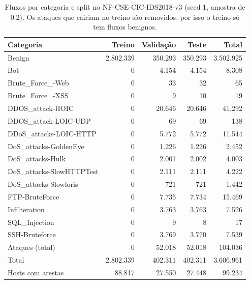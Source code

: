\begin{table}[ht]
\centering
\caption{Fluxos por categoria e split no NF-CSE-CIC-IDS2018-v3 (seed 1, amostra de 0.2). Os ataques que cairiam no treino são removidos, por isso o treino só tem fluxos benignos.}
\label{tab:split-nf-cse-cic-ids2018-v3}
\begin{tabular}{lrrrr}
\toprule
Categoria & Treino & Validação & Teste & Total \\
\midrule
Benign & 2.802.339 & 350.293 & 350.293 & 3.502.925 \\
Bot & 0 & 4.154 & 4.154 & 8.308 \\
Brute\_Force\_-Web & 0 & 33 & 32 & 65 \\
Brute\_Force\_-XSS & 0 & 9 & 10 & 19 \\
DDOS\_attack-HOIC & 0 & 20.646 & 20.646 & 41.292 \\
DDOS\_attack-LOIC-UDP & 0 & 69 & 69 & 138 \\
DDoS\_attacks-LOIC-HTTP & 0 & 5.772 & 5.772 & 11.544 \\
DoS\_attacks-GoldenEye & 0 & 1.226 & 1.226 & 2.452 \\
DoS\_attacks-Hulk & 0 & 2.001 & 2.002 & 4.003 \\
DoS\_attacks-SlowHTTPTest & 0 & 2.111 & 2.111 & 4.222 \\
DoS\_attacks-Slowloris & 0 & 721 & 721 & 1.442 \\
FTP-BruteForce & 0 & 7.735 & 7.734 & 15.469 \\
Infilteration & 0 & 3.763 & 3.763 & 7.526 \\
SQL\_Injection & 0 & 9 & 8 & 17 \\
SSH-Bruteforce & 0 & 3.769 & 3.770 & 7.539 \\
Ataques (total) & 0 & 52.018 & 52.018 & 104.036 \\
Total & 2.802.339 & 402.311 & 402.311 & 3.606.961 \\
Hosts com arestas & 88.817 & 27.550 & 27.448 & 99.234 \\
\bottomrule
\end{tabular}
\end{table}
